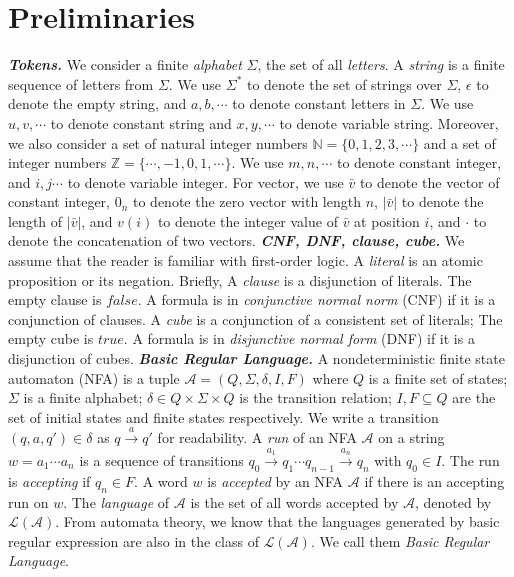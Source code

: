 \documentclass[sigconf]{acmart}
\newcommand*{\lan}{\mathcal{L}}
\newcommand*{\highlight}[1]{\textbf{\textit{#1}}}
\newcommand*{\aut}{\mathcal{A}}
\begin{document}
\section{Preliminaries} \label{sec:pre}
\highlight{Tokens.} We consider a finite \emph{alphabet} $\Sigma$, the set of all \emph{letters}. A
\emph{string} is a finite sequence of letters from $\Sigma$. We use $\Sigma^*$ to
denote the set of strings over $\Sigma$, $\epsilon$ to denote the empty string, and $a,
  b,\cdots$ to denote constant letters in $\Sigma$. We use $u, v,\cdots$ to denote constant
string and $x, y,\cdots$ to denote variable string. Moreover, we also consider a set of natural integer numbers $\mathbb{N} = \{0,1,2,3,\cdots\}$ and a set of integer numbers $\mathbb{Z}= \{\cdots, -1, 0, 1, \cdots\}$. We use $m,n,\cdots$ to
denote constant integer, and $i,j\cdots$ to denote variable integer. For vector, we use $\bar{v}$ to denote the vector of constant integer, $0_n$ to denote the zero vector with length $n$, $|\bar{v}|$ to denote the length of $|\bar{v}|$, and $v(i)$ to denote the integer value of $\bar{v}$
at position $i$, and $\cdot$ to denote the concatenation of two vectors.\newline
\highlight{CNF, DNF, clause, cube.} We assume that the reader is familiar with first-order logic. A \emph{literal} is an atomic proposition or its negation. Briefly, A \emph{clause} is a disjunction of literals. The empty clause is $false$. A formula is in \emph{conjunctive normal norm} (CNF) if it is a conjunction of clauses. A \emph{cube} is a conjunction of a consistent set of literals; The empty cube is $true$. A formula is in \emph{disjunctive normal form} (DNF) if it is a disjunction of cubes.\newline
\highlight{Basic Regular Language.} A nondeterministic finite state automaton (NFA) is a tuple $\aut=(Q, \Sigma, \delta, I, F)$ where $Q$ is a finite set of states; $\Sigma$ is a finite alphabet; $\delta\in Q\times\Sigma\times Q$ is the transition relation; $I, F\subseteq Q$ are the set of initial states and finite states respectively. We write a transition $(q, a, q') \in \delta$ as $q\xrightarrow{a} q'$ for readability. A \emph{run} of an NFA $\aut$ on a string $w = a_1\cdots a_n$ is a sequence of transitions $q_0\xrightarrow{a_1}q_1\cdots q_{n-1}\xrightarrow{a_n}q_n$ with $q_0\in I$. The run is \emph{accepting} if $q_{n}\in F$. A word $w$ is \emph{accepted} by an NFA $\aut$ if there is an accepting run on $w$. The \emph{language} of $\aut$ is the set of all words accepted by $\aut$, denoted by $\lan(\aut)$. From automata theory\cite{aut_hopcraft}, we know that the languages generated by basic regular expression are also in the class of $\lan(\aut)$. We call them \emph{Basic Regular Language}.
\end{document}
